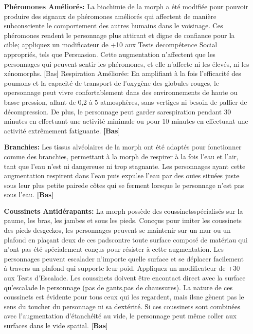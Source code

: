 \textbf{Phéromones Améliorés: }La biochimie de la morph a été modifiée pour pouvoir produire des signaux de phéromones améliorés qui affectent de manière subconsciente le comportement des autres humains dans le voisinage. Ces phéromones rendent le personnage plus attirant et digne de confiance pour la cible; appliquez un modificateur de +10 aux Tests decompétence Social appropriés, tels que Persuasion. Cette augmentation n'affectent que les personnages qui peuvent sentir les phéromones, et elle n'affecte ni les élevés, ni les xénomorphs. [Bas] Respiration Améliorée: En amplifiant à la fois l'efficacité des poumons et la capacité de transport de l'oxygène des globules rouges, le opersonnage peut vivre confortablement dans des environnements de haute ou basse pression, allant de 0,2 à 5 atmosphères, sans vertiges ni besoin de pallier de décompression. De plus, le personnage peut garder sarespiration pendant 30 minutes en effectuant une activité minimale ou pour 10 minutes en effectuant une activité extrêmement fatiguante. \textbf{[Bas]} 

\textbf{Branchies:} Les tissus alvéolaires de la morph ont été adaptés pour fonctionner comme des branchies, permettant à la morph de respirer à la fois l'eau et l'air, tant que l'eau n'est ni dangereuse ni trop stagnante. Les personnages ayant cette augmentation respirent dans l'eau puis expulse l'eau par des ouïes situées juste sous leur plus petite pairede côtes qui se ferment lorsque le personnage n'est pas sous l'eau. \textbf{[Bas]} 

\textbf{Coussinets Antidérapants:} La morph possède des coussinetsspécialisés sur la paume, les bras, les jambes et sous les pieds. Concçus pour imiter les coussinets des pieds desgeckos, les personnages peuvent se maintenir sur un mur ou un plafond en plaçant deux de ces padscontre toute surface composé de matériau qui n'ont pas été spécialement conçus pour résister à cette augmentation. Les personnages peuvent escalader n'importe quelle surface et se déplacer facilement à travers un plafond qui supporte leur poid. Appliquez un modificateur de +30 aux Tests d'Escalade. Les coussinets doivent être encontact direct avec la surface qu'escalade le personnage (pas de gants,pas de chaussures). La nature de ces coussinets est évidente pour tous ceux qui les regardent, mais ilsne gènent pas le sens du toucher du personnage ni sa dextérité. Si ces coussinets sont combinées avec l'augmentation d'étanchéité au vide, le personnage peut même coller aux surfaces dans le vide spatial. \textbf{[Bas]} 

